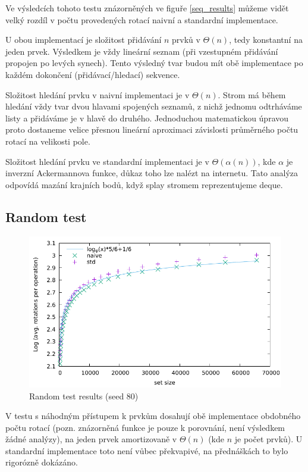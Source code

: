 \documentclass[a4paper,12pt]{article} %
\begin{document}
Ve výsledcích tohoto testu znázorněných ve figuře \ref{seq_results} můžeme vidět velký rozdíl v počtu provedených rotací naivní a standardní implementace.

U obou implementací je složitost přidávání $n$ prvků v $\Theta(n)$, tedy konstantní na jeden prvek. Výsledkem je vždy lineární seznam (při vzestupném přidávání propojen po levých synech). Tento výsledný tvar budou mít obě implementace po každém dokončení (přidávací/hledací) sekvence.

Složitost hledání prvku v naivní implementaci je v $\Theta(n)$. Strom má během hledání vždy tvar dvou hlavami spojených seznamů, z nichž jednomu odtrháváme listy a přidáváme je v hlavě do druhého. Jednoduchou matematickou úpravou proto dostaneme velice přesnou lineární aproximaci závislosti průměrného počtu rotací na velikosti pole.

Složitost hledání prvku ve standardní implementaci je v $\Theta(\alpha(n))$, kde $\alpha$ je inverzní Ackermannova funkce, důkaz toho lze nalézt na internetu. Tato analýza odpovídá mazání krajních bodů, když splay stromem reprezentujeme deque.

\pagebreak

\subsection*{Random test}

\begin{figure}[!htb]
    \caption{Random test results (seed 80)}
    \label{rng_results}
    \includegraphics{random.pdf}    
\end{figure}

V testu s náhodným přístupem k prvkům dosahují obě implementace obdobného počtu rotací (pozn. znázorněná funkce je pouze k porovnání, není výsledkem žádné analýzy), na jeden prvek amortizovaně v $\Theta(n)$ (kde $n$ je počet prvků). U standardní implementace toto není vůbec překvapivé, na přednáškách to bylo rigorózně dokázáno.
\end{document}
